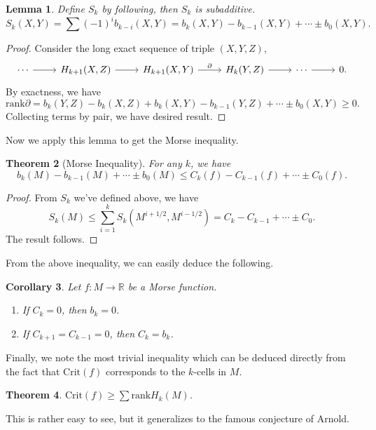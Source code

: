 \documentclass{article}
\newtheorem{theorem}{Theorem}[section]
\newtheorem{lemma}[theorem]{Lemma}
\newtheorem{corollary}[theorem]{Corollary}
\newcommand{\R}{\mathbb{R}}
\newcommand{\pp}{\partial}
\newcommand{\Crit}{\mathrm{Crit}}
\newcommand{\rank}{\mathrm{rank}}
\begin{document}
	\begin{lemma}\rm
	Define $S_k$ by following, then $S_k$ is subadditive.
		$$S_k(X,Y)=\sum(-1)^ib_{k-i}(X,Y)=b_k(X,Y)-b_{k-1}(X,Y)+\cdots\pm b_0(X,Y).$$
	\end{lemma}
		\begin{proof}
		Consider the long exact sequence of triple $(X,Y,Z)$,
			$$\begin{tikzcd}
			\cdots\ar[r]&	H_{k+1}(X,Z)\ar[r]&	H_{k+1}(X,Y)\ar[r,"\pp"]&	H_k(Y,Z)\ar[r]&\cdots\ar[r]&0.
			\end{tikzcd}$$
		By exactness, we have
			$$
			\rank\pp=b_k(Y,Z)-b_k(X,Z)+b_k(X,Y)-b_{k-1}(Y,Z)+\cdots\pm b_0(X,Y)\geq0.
			$$
		Collecting terms by pair, we have desired result.
		\end{proof}

Now we apply this lemma to get the Morse inequality.
	\begin{theorem}[Morse Inequality]\rm
	For any $k$, we have
		$$b_k(M)-b_{k-1}(M)+\cdots\pm b_0(M)\leq C_k(f)-C_{k-1}(f)+\cdots\pm C_0(f).$$
	\end{theorem}
		\begin{proof}
		From $S_k$ we've defined above, we have
			$$S_k(M)\leq\sum_{i=1}^kS_k(M^{i+1/2},M^{i-1/2})=C_k-C_{k-1}+\cdots\pm C_0.$$
		The result follows.
		\end{proof}
From the above inequality, we can easily deduce the following.
	\begin{corollary}\rm
	Let $f:M\to\R$ be a Morse function.
	\begin{enumerate}
	\item If $C_k=0$, then $b_k=0$.
	\item If $C_{k+1}=C_{k-1}=0$, then $C_k=b_k$.
	\end{enumerate}
	\end{corollary}

Finally, we note the most trivial inequality which can be deduced directly from the fact that $\Crit(f)$ corresponds to the $k$-cells in $M$.
	\begin{theorem}\rm
	$\Crit(f)\geq\sum\rank H_k(M)$.
	\end{theorem}
This is rather easy to see, but it generalizes to the famous conjecture of Arnold.
	
\end{document}
